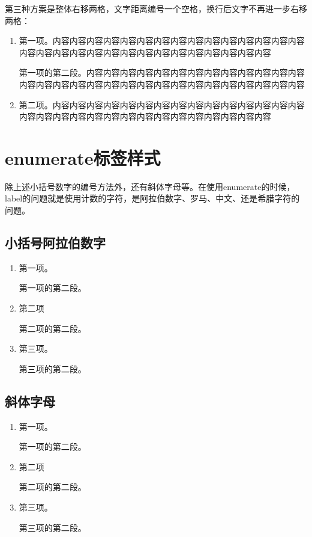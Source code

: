 第三种方案是整体右移两格，文字距离编号一个空格，换行后文字不再进一步右移两格：
\begin{enumerate}[topsep = 0 pt, itemsep= 0 pt, parsep=0pt, partopsep=0pt, leftmargin=24pt, itemindent=20pt, labelsep=6pt, listparindent=20pt, label=(\arabic*)]
	\item 第一项。内容内容内容内容内容内容内容内容内容内容内容内容内容内容内容内容内容内容内容内容内容内容内容内容内容内容内容内容内容内容

	第一项的第二段。内容内容内容内容内容内容内容内容内容内容内容内容内容内容内容内容内容内容内容内容内容内容内容内容内容内容内容内容内容内容
	\item 第二项。内容内容内容内容内容内容内容内容内容内容内容内容内容内容内容内容内容内容内容内容内容内容内容内容内容内容内容内容内容内容
	
\end{enumerate}

\section{enumerate标签样式}
除上述小括号数字的编号方法外，还有斜体字母等。在使用enumerate的时候，label的问题就是使用计数的字符，是阿拉伯数字、罗马、中文、还是希腊字符的问题。

\subsection{小括号阿拉伯数字}
\begin{enumerate}[topsep = 0 pt, itemsep= 0 pt, parsep=0pt, partopsep=0pt, leftmargin=0pt, itemindent=44pt, labelsep=6pt, listparindent=24pt, label=\arabic*)]
	\item 第一项。

	第一项的第二段。
	\item 第二项
	
	第二项的第二段。
	\item 第三项。
	
	第三项的第二段。
\end{enumerate}



\subsection{斜体字母}
\begin{enumerate}[topsep = 0 pt, itemsep= 0 pt, parsep=0pt, partopsep=0pt, leftmargin=0pt, itemindent=44pt, labelsep=6pt, listparindent=24pt, label=\emph{\alph*}.]
	\item 第一项。

	第一项的第二段。
	\item 第二项
	
	第二项的第二段。
	\item 第三项。
	
	第三项的第二段。
\end{enumerate}

